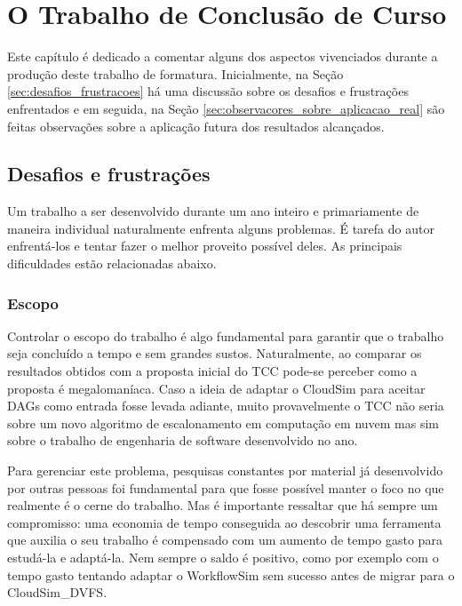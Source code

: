 \chapter{O Trabalho de Conclusão de Curso}
\label{cap:o_tcc}

Este capítulo é dedicado a comentar alguns dos aspectos vivenciados durante a
produção deste trabalho de formatura. Inicialmente, na Seção
\ref{sec:desafios_frustracoes} há uma discussão sobre os desafios e frustrações
enfrentados e em seguida, na Seção \ref{sec:observacores_sobre_aplicacao_real}
são feitas observações sobre a aplicação futura dos resultados alcançados.

\section{Desafios e frustrações}
\label{sec:desafios_frustacoes}

Um trabalho a ser desenvolvido durante um ano inteiro e primariamente de maneira
individual naturalmente enfrenta alguns problemas. É tarefa do autor enfrentá-los
e tentar fazer o melhor proveito possível deles. As principais dificuldades
estão relacionadas abaixo.

\subsection{Escopo} %
\label{sub:escopo}

Controlar o escopo do trabalho é algo fundamental para garantir que o trabalho
seja concluído a tempo e sem grandes sustos. Naturalmente, ao comparar os
resultados obtidos com a proposta inicial do TCC pode-se perceber como a
proposta é megalomaníaca. Caso a ideia de adaptar o CloudSim para aceitar DAGs
como entrada fosse levada adiante, muito provavelmente o TCC não seria sobre um
novo algoritmo de escalonamento em computação em nuvem mas sim sobre o trabalho
de engenharia de software desenvolvido no ano.

Para gerenciar este problema, pesquisas constantes por material já desenvolvido
por outras pessoas foi fundamental para que fosse possível manter o foco
no que realmente é o cerne do trabalho. Mas é importante ressaltar que há sempre
um compromisso: uma economia de tempo conseguida ao descobrir uma ferramenta que
auxilia o seu trabalho é compensado com um aumento de tempo gasto para estudá-la
e adaptá-la. Nem sempre o saldo é positivo, como por exemplo com o tempo gasto
tentando adaptar o WorkflowSim sem sucesso antes de migrar para o CloudSim\_DVFS.

